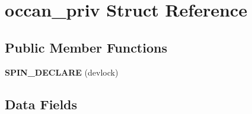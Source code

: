 \hypertarget{structoccan__priv}{}\section{occan\+\_\+priv Struct Reference}
\label{structoccan__priv}
\subsection*{Public Member Functions}
\begin{DoxyCompactItemize}
\item 
\mbox{\label{structoccan__priv_a507f2aecac527b0a9f684636b61658a2}} 
{\bfseries S\+P\+I\+N\+\_\+\+D\+E\+C\+L\+A\+RE} (devlock)
\end{DoxyCompactItemize}
\subsection*{Data Fields}
